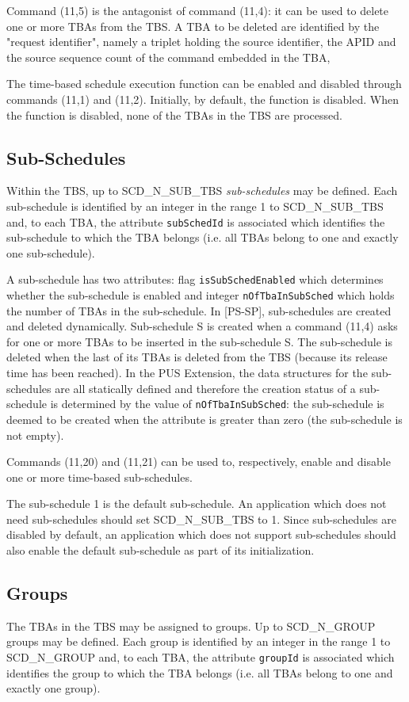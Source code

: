\documentclass{pnp_article}
\begin{document}
Command (11,5) is the antagonist of command (11,4): it can be used to delete one or more TBAs from the TBS. A TBA to be deleted are identified by the "request identifier", namely a triplet holding the source identifier, the APID and the source sequence count of the command embedded in the TBA, 

The time-based schedule execution function can be enabled and disabled through commands (11,1) and (11,2). Initially, by default, the function is disabled. When the function is disabled, none of the TBAs in the TBS are processed. 

\subsection{Sub-Schedules}
Within the TBS, up to SCD\_N\_SUB\_TBS \textit{sub-schedules} may be defined. Each sub-schedule is identified by an integer in the range 1 to SCD\_N\_SUB\_TBS and, to each TBA, the attribute \texttt{subSchedId} is associated which identifies the sub-schedule to which the TBA belongs (i.e. all TBAs belong to one and exactly one sub-schedule). 

A sub-schedule has two attributes: flag \texttt{isSubSchedEnabled} which determines whether the sub-schedule is enabled and integer \texttt{nOfTbaInSubSched} which holds the number of TBAs in the sub-schedule. In [PS-SP], sub-schedules are created and deleted dynamically. Sub-schedule S is created when a command (11,4) asks for one or more TBAs to be inserted in the sub-schedule S. The sub-schedule is deleted when the last of its TBAs is deleted from the TBS (because its release time has been reached). In the PUS Extension, the data structures for the sub-schedules are all statically defined and therefore the creation status of a sub-schedule is determined by the value of \texttt{nOfTbaInSubSched}: the sub-schedule is deemed to be created when the attribute is greater than zero (the sub-schedule is not empty).

Commands (11,20) and (11,21) can be used to, respectively, enable and disable one or more time-based sub-schedules.

The sub-schedule 1 is the default sub-schedule. An application which does not need sub-schedules should set SCD\_N\_SUB\_TBS to 1. Since sub-schedules are disabled by default, an application which does not support sub-schedules should also enable the default sub-schedule as part of its initialization.

\subsection{Groups}
The TBAs in the TBS may be assigned to groups. Up to SCD\_N\_GROUP groups may be defined. Each group is identified by an integer in the range 1 to SCD\_N\_GROUP and, to each TBA, the attribute \texttt{groupId} is associated which identifies the group to which the TBA belongs (i.e. all TBAs belong to one and exactly one group). 
\end{document}
